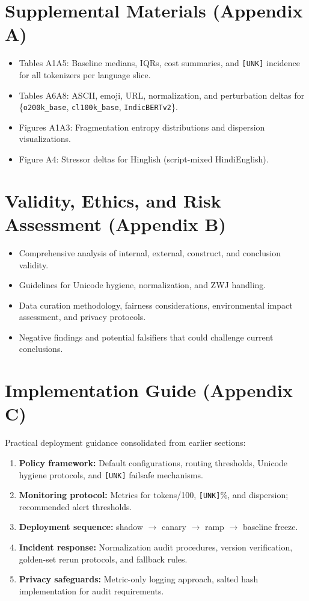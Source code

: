 \documentclass{article}
\begin{document}

\appendix

\section{Supplemental Materials (Appendix A)}
\begin{itemize}
    \item Tables A1\textendash{}A5: Baseline medians, IQRs, cost summaries, and \texttt{[UNK]} incidence for all tokenizers per language slice.
    \item Tables A6\textendash{}A8: ASCII, emoji, URL, normalization, and perturbation deltas for \{\texttt{o200k\_base}, \texttt{cl100k\_base}, \texttt{IndicBERTv2}\}.
    \item Figures A1\textendash{}A3: Fragmentation entropy distributions and dispersion visualizations.
    \item Figure A4: Stressor deltas for Hinglish (script-mixed Hindi\textendash{}English).
\end{itemize}

\section{Validity, Ethics, and Risk Assessment (Appendix B)}
\begin{itemize}
    \item Comprehensive analysis of internal, external, construct, and conclusion validity.
    \item Guidelines for Unicode hygiene, normalization, and ZWJ handling.
    \item Data curation methodology, fairness considerations, environmental impact assessment, and privacy protocols.
    \item Negative findings and potential falsifiers that could challenge current conclusions.
\end{itemize}

\section{Implementation Guide (Appendix C)}
Practical deployment guidance consolidated from earlier sections:
\begin{enumerate}
    \item \textbf{Policy framework:} Default configurations, routing thresholds, Unicode hygiene protocols, and \texttt{[UNK]} failsafe mechanisms.
    \item \textbf{Monitoring protocol:} Metrics for tokens/100, \texttt{[UNK]}\%, and dispersion; recommended alert thresholds.
    \item \textbf{Deployment sequence:} shadow $\to$ canary $\to$ ramp $\to$ baseline freeze.
    \item \textbf{Incident response:} Normalization audit procedures, version verification, golden-set rerun protocols, and fallback rules.
    \item \textbf{Privacy safeguards:} Metric-only logging approach, salted hash implementation for audit requirements.
\end{enumerate}
\end{document}
